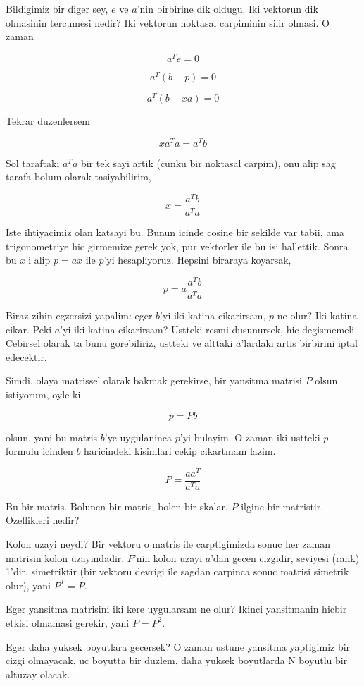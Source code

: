 \documentclass[12pt,fleqn]{article}\usepackage{../common}
\begin{document}
Bildigimiz bir diger sey, $e$ ve $a$'nin birbirine dik oldugu. Iki vektorun
dik olmasinin tercumesi nedir? Iki vektorun noktasal carpiminin sifir
olmasi. O zaman

\[ a^T e = 0 \]

\[ a^T(b - p) = 0 \]

\[ a^T(b - xa) = 0 \]

Tekrar duzenlersem

\[ xa^Ta = a^Tb \]

Sol taraftaki $a^Ta$ bir tek sayi artik (cunku bir noktasal carpim), onu
alip sag tarafa bolum olarak tasiyabilirim,

\[ x = \frac{ a^Tb}{a^Ta} \]

Iste ihtiyacimiz olan katsayi bu. Bunun icinde cosine bir sekilde var
tabii, ama trigonometriye hic girmemize gerek yok, pur vektorler ile bu isi
hallettik. Sonra bu $x$'i alip $p = ax$ ile $p$'yi hesapliyoruz. Hepsini
biraraya koyarsak, 

\[ p = a\frac{ a^Tb}{a^Ta} \]

Biraz zihin egzersizi yapalim: eger $b$'yi iki katina cikarirsam, $p$ ne
olur? Iki katina cikar. Peki $a$'yi  iki katina cikarirsam? Ustteki resmi
dusunursek, hic degismemeli. Cebirsel olarak ta bunu gorebiliriz, ustteki
ve alttaki $a$'lardaki artis birbirini iptal edecektir. 

Simdi, olaya matrissel olarak bakmak gerekirse, bir yansitma matrisi $P$
olsun istiyorum, oyle ki 

\[ p = P b \]

olsun, yani bu matris $b$'ye uygulaninca $p$'yi bulayim. O zaman iki
ustteki $p$ formulu icinden $b$ haricindeki kisimlari cekip cikartmam
lazim.

\[ P  = \frac{ aa^T}{a^Ta} \]

Bu bir matris. Bolunen bir matris, bolen bir skalar. $P$ ilginc bir
matristir. Ozellikleri nedir? 

Kolon uzayi neydi? Bir vektoru o matris ile carptigimizda sonuc her zaman
matrisin kolon uzayindadir. $P$'nin kolon uzayi $a$'dan gecen cizgidir,
seviyesi (rank) 1'dir, simetriktir (bir vektoru devrigi ile sagdan carpinca
sonuc matrisi simetrik olur), yani $P^T = P$. 

Eger yansitma matrisini iki kere uygularsam ne olur? Ikinci yansitmanin
hicbir etkisi olmamasi gerekir, yani $P = P^2$. 

Eger daha yuksek boyutlara gecersek? O zaman ustune yansitma yaptigimiz bir
cizgi olmayacak, uc boyutta bir duzlem, daha yuksek boyutlarda N boyutlu
bir altuzay olacak.
\end{document}
